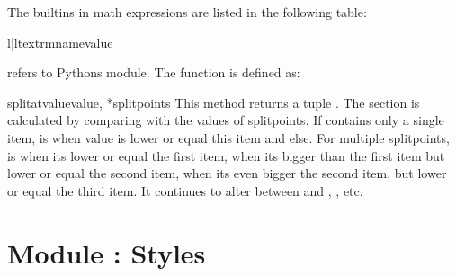 The builtins in math expressions are listed in the following table:
\begin{tableii}{l|l}{textrm}{name}{value}
\end{tableii}
 refers to Pythons  module. The
 function is defined as:

\begin{funcdesc}{splitatvalue}{value, *splitpoints}
  This method returns a tuple .
  The section is calculated by comparing  with the values
  of {splitpoints}. If  contains only a single item,
   is  when value is lower or equal this item
  and  else. For multiple splitpoints,  is
   when its lower or equal the first item,  when
  its bigger than the first item but lower or equal the second item,
   when its even bigger the second item, but lower or equal
  the third item. It continues to alter between  and
  , , etc.
\end{funcdesc}


\section{Module : Styles} %
\label{graph:style}


